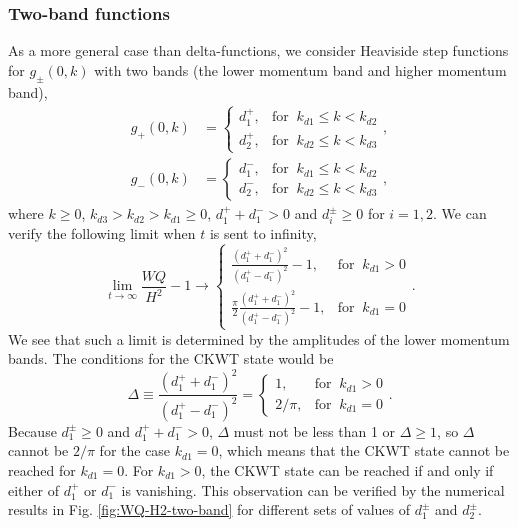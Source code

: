 \documentclass[english,aps,superscriptaddress,preprint]{revtex4-1}
\begin{document}
\subsubsection{Two-band functions}

As a more general case than delta-functions, we consider Heaviside
step functions for $g_{\pm}(0,k)$ with two bands (the lower momentum
band and higher momentum band), 
\begin{align}
g_{+}(0,k) & =\begin{cases}
d_{1}^{+}, & \mathrm{for}\;\;k_{d1}\leq k<k_{d2}\\
d_{2}^{+}, & \mathrm{for}\;\;k_{d2}\leq k<k_{d3}
\end{cases},\\
g_{-}(0,k) & =\begin{cases}
d_{1}^{-}, & \mathrm{for}\;\;k_{d1}\leq k<k_{d2}\\
d_{2}^{-}, & \mathrm{for}\;\;k_{d2}\leq k<k_{d3}
\end{cases},
\end{align}
where $k\geq0$, $k_{d3}>k_{d2}>k_{d1}\geq0$, $d_{1}^{+}+d_{1}^{-}>0$
and $d_{i}^{\pm}\geq0$ for $i=1,2$. We can verify the following
limit when $t$ is sent to infinity, 
\begin{equation}
\lim_{t\rightarrow\infty}\frac{WQ}{H^{2}}-1\rightarrow\begin{cases}
\frac{\left(d_{1}^{+}+d_{1}^{-}\right)^{2}}{\left(d_{1}^{+}-d_{1}^{-}\right)^{2}}-1, & \mathrm{for}\;\;k_{d1}>0\\
\frac{\pi}{2}\frac{\left(d_{1}^{+}+d_{1}^{-}\right)^{2}}{\left(d_{1}^{+}-d_{1}^{-}\right)^{2}}-1, & \mathrm{for}\;\;k_{d1}=0
\end{cases}.
\end{equation}
We see that such a limit is determined by the amplitudes of the lower
momentum bands. The conditions for the CKWT state would be 
\begin{equation}
\Delta\equiv\frac{\left(d_{1}^{+}+d_{1}^{-}\right)^{2}}{\left(d_{1}^{+}-d_{1}^{-}\right)^{2}}=\left\{ \begin{array}{ll}
1, & \mathrm{for}\;\;k_{d1}>0\\
2/\pi, & \mathrm{for}\;\;k_{d1}=0
\end{array}\right..
\end{equation}
Because $d_{1}^{\pm}\geq0$ and $d_{1}^{+}+d_{1}^{-}>0$, $\Delta$
must not be less than 1 or $\Delta\geq1$, so $\Delta$ cannot be
$2/\pi$ for the case $k_{d1}=0$, which means that the CKWT state
cannot be reached for $k_{d1}=0$. For $k_{d1}>0$, the CKWT state
can be reached if and only if either of $d_{1}^{+}$ or $d_{1}^{-}$
is vanishing. This observation can be verified by the numerical results
in Fig. \ref{fig:WQ-H2-two-band} for different sets of values of
$d_{1}^{\pm}$ and $d_{2}^{\pm}$.
\end{document}
